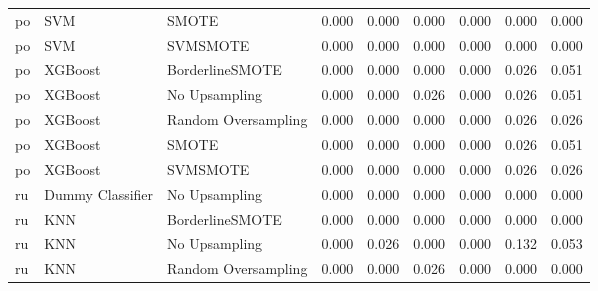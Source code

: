 \begin{tabular}{lllllllll}
      po &                          SVM &               SMOTE & 0.000 &                     0.000 &                 0.000 &                  0.000 &                                   0.000 &     0.000 \\
      po &                          SVM &            SVMSMOTE & 0.000 &                     0.000 &                 0.000 &                  0.000 &                                   0.000 &     0.000 \\
      po &                      XGBoost &     BorderlineSMOTE & 0.000 &                     0.000 &                 0.000 &                  0.000 &                                   0.026 &     0.051 \\
      po &                      XGBoost &       No Upsampling & 0.000 &                     0.000 &                 0.026 &                  0.000 &                                   0.026 &     0.051 \\
      po &                      XGBoost & Random Oversampling & 0.000 &                     0.000 &                 0.000 &                  0.000 &                                   0.026 &     0.026 \\
      po &                      XGBoost &               SMOTE & 0.000 &                     0.000 &                 0.000 &                  0.000 &                                   0.026 &     0.051 \\
      po &                      XGBoost &            SVMSMOTE & 0.000 &                     0.000 &                 0.000 &                  0.000 &                                   0.026 &     0.026 \\
      ru &             Dummy Classifier &       No Upsampling & 0.000 &                     0.000 &                 0.000 &                  0.000 &                                   0.000 &     0.000 \\
      ru &                          KNN &     BorderlineSMOTE & 0.000 &                     0.000 &                 0.000 &                  0.000 &                                   0.000 &     0.000 \\
      ru &                          KNN &       No Upsampling & 0.000 &                     0.026 &                 0.000 &                  0.000 &                                   0.132 &     0.053 \\
      ru &                          KNN & Random Oversampling & 0.000 &                     0.000 &                 0.026 &                  0.000 &                                   0.000 &     0.000 \\

\end{tabular}
